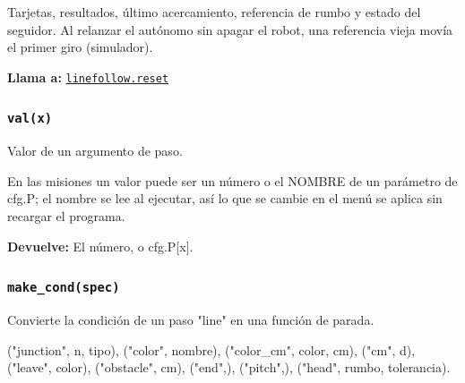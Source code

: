 Tarjetas, resultados, último acercamiento, referencia de rumbo y estado del seguidor. Al relanzar el autónomo sin apagar el robot, una referencia vieja movía el primer giro (simulador).

\noindent\textbf{Llama a:} \hyperref[fn:linefollow:reset]{\texttt{linefollow.reset}}\par

\subsubsection{\texttt{val(x)}}\label{fn:autonomous:val}
\noindent Valor de un argumento de paso.

En las misiones un valor puede ser un número o el NOMBRE de un parámetro de cfg.P; el nombre se lee al ejecutar, así lo que se cambie en el menú se aplica sin recargar el programa.

\par{}\par\smallskip
\noindent\textbf{Devuelve:} El número, o cfg.P[x].\par

\subsubsection{\texttt{make\_\allowbreak{}cond(spec)}}\label{fn:autonomous:make-cond}
\noindent Convierte la condición de un paso "line" en una función de parada.

("junction", n, tipo), ("color", nombre), ("color\_cm", color, cm), ("cm", d), ("leave", color), ("obstacle", cm), ("end",), ("pitch",), ("head", rumbo, tolerancia).

